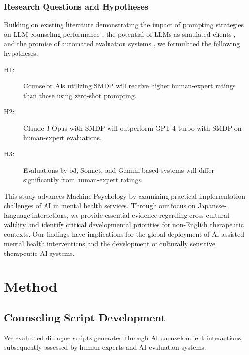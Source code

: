 \documentclass{wiley-article}
\begin{document}
\subsubsection*{Research Questions and Hypotheses}

Building on existing literature demonstrating the impact of prompting strategies on LLM counseling performance \citep{leeComparativeStudyPerformance2024,huangEmpowermentLargeLanguage2024}, the potential of LLMs as simulated clients \citep{potterEnhancingCommunicationClinical2024,grayIncreasingRealismVariety2024}, and the promise of automated evaluation systems \citep{rudolphAutomatedFeedbackGeneration2024,sharmaHumanAICollaboration2023}, we formulated the following hypotheses:

\begin{description}
  \item[H1:] Counselor AIs utilizing SMDP will receive higher human-expert ratings than those using zero-shot prompting.
  \item[H2:] Claude-3-Opus with SMDP will outperform GPT-4-turbo with SMDP on human-expert evaluations.
  \item[H3:] Evaluations by o3, Sonnet, and Gemini-based systems will differ significantly from human-expert ratings.
\end{description}

This study advances Machine Psychology by examining practical implementation challenges of AI in mental health services. Through our focus on Japanese-language interactions, we provide essential evidence regarding cross-cultural validity and identify critical developmental priorities for non-English therapeutic contexts. Our findings have implications for the global deployment of AI-assisted mental health interventions and the development of culturally sensitive therapeutic AI systems.





\section*{Method}

\subsection*{Counseling Script Development}

We evaluated dialogue scripts generated through AI counselor\textendash{}client interactions, subsequently assessed by human experts and AI evaluation systems.
\end{document}
